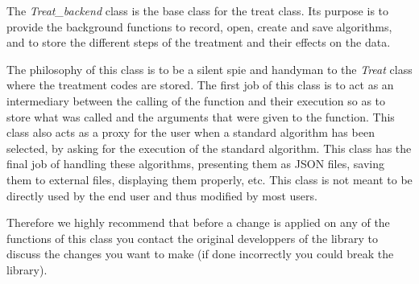 The \textit{Treat\_backend} class is the base class for the treat class. Its purpose is to provide the background functions to record, open, create and save algorithms, and to store the different steps of the treatment and their effects on the data. 

The philosophy of this class is to be a silent spie and handyman to the \textit{Treat} class where the treatment codes are stored. The first job of this class is to act as an intermediary between the calling of the function and their execution so as to store what was called and the arguments that were given to the function. This class also acts as a proxy for the user when a standard algorithm has been selected, by asking for the execution of the standard algorithm. This class has the final job of handling these algorithms, presenting them as JSON files, saving them to external files, displaying them properly, etc. This class is not meant to be directly used by the end user and thus modified by most users.

Therefore we highly recommend that before a change is applied on any of the functions of this class  you contact the original developpers of the library to discuss the changes you want to make (if done incorrectly you could break the library).

